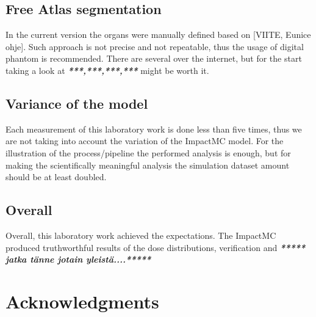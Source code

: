 \documentclass[fleqn,10pt]{SelfArx} %
\begin{document}
\subsection{Free Atlas segmentation}
In the current version the organs were manually defined based on [VIITE, Eunice ohje]. Such approach is not precise and not repeatable, thus the usage of digital phantom is recommended. There are several over the internet, but for the start taking a look at \textit{\textbf{***,***,***,***}} might be worth it.


\subsection{Variance of the model}
Each measurement of this laboratory work is done less than five times, thus we are not taking into account the variation of the ImpactMC model. For the illustration of the process/pipeline the performed analysis is enough, but for making the scientifically meaningful analysis the simulation dataset amount should be at least doubled.




\subsection{Overall}
Overall, this laboratory work achieved the expectations. The ImpactMC produced truthworthful results of the dose distributions, verification and \textit{\textbf{***** jatka tänne jotain yleistä....*****}}


\section*{Acknowledgments} %

\end{document}
